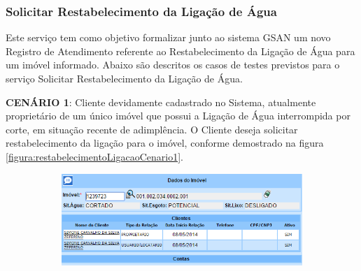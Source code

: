 \subsubsection{Solicitar Restabelecimento da Ligação de Água}
Este serviço tem como objetivo formalizar junto ao sistema GSAN um novo Registro de Atendimento referente ao Restabelecimento da Ligação de Água para um imóvel informado.
Abaixo são descritos os casos de testes previstos para o serviço Solicitar Restabelecimento da Ligação de Água.
\begin{flushleft}
	\begin{description}
		\item \textbf{CENÁRIO 1}: Cliente devidamente cadastrado no Sistema, atualmente proprietário de um único imóvel que possui a Ligação de Água interrompida por corte, em situação recente de adimplência. O Cliente deseja solicitar restabelecimento da ligação para o imóvel, conforme demostrado na figura \ref{figura:restabelecimentoLigacaoCenario1}.
		\begin{figure}[H]
			\centering
			\caption{Restabelecimento da Ligação de Água - Cenário de Teste 1}
			\label{figura:restabelecimentoLigacaoCenario1}
			\begin{subfigure}[H]{\textwidth}
				\centering
				\includegraphics{figuras/cenarios/restabelecimento/cenario_1.PNG}
			\end{subfigure}
		\end{figure}
	\end{description}
	

\end{flushleft}
